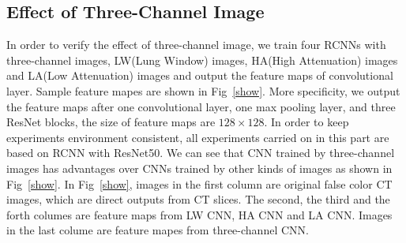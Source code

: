 \documentclass[journal]{IEEEtran}
\begin{document}
\subsection{Effect of Three-Channel Image}
\label{effectiveness}
In order to verify the effect of three-channel image, we train four RCNNs with three-channel images, LW(Lung Window) images, HA(High Attenuation) images and LA(Low Attenuation) images and output the feature maps of convolutional layer. Sample feature mapes are shown in Fig~\ref{show}. More specificity, we output the feature maps after one convolutional layer, one max pooling layer, and three ResNet blocks, the size of feature maps are $128 \times 128$. In order to keep experiments environment consistent, all experiments carried on in this part are based on RCNN with ResNet50. We can see that CNN trained by three-channel images has advantages over CNNs trained by other kinds of images as shown in Fig~\ref{show}. 
In Fig~\ref{show}, images in the first column are original false color CT images, which are direct outputs from CT slices. The second, the third and the forth columes are feature maps from LW CNN, HA CNN and LA CNN. Images in the last colume are feature mapes from three-channel CNN.
\end{document}
